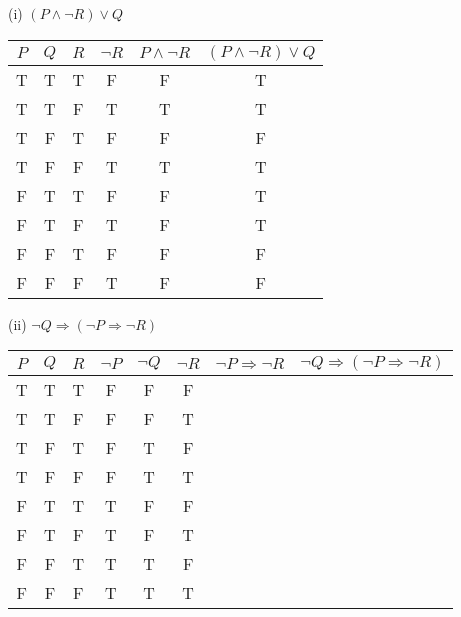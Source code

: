 \documentclass{article}
\begin{document}
(i) $(P \land \neg R) \lor Q$\\
\begin{tabular}{|c|c|c|c|c|c|}
    \hline
    $P$ & $Q$ & $R$ & $\neg R$ & $ P \land \neg R$ & $(P \land \neg R) \lor Q$ \\
    \hline
    T   & T   & T   & F        & F                 & T                         \\
    T   & T   & F   & T        & T                 & T                         \\
    T   & F   & T   & F        & F                 & F                         \\
    T   & F   & F   & T        & T                 & T                         \\
    F   & T   & T   & F        & F                 & T                         \\
    F   & T   & F   & T        & F                 & T                         \\
    F   & F   & T   & F        & F                 & F                         \\
    F   & F   & F   & T        & F                 & F                         \\
    \hline
\end{tabular}

(ii) $\neg Q \Rightarrow (\neg P \Rightarrow \neg R)$\\
\begin{tabular}{|c|c|c|c|c|c|c|c|}
    \hline
    $P$ & $Q$ & $R$ & $\neg P $ & $\neg Q$ & $\neg R$ & $\neg P \Rightarrow \neg R $ & $\neg Q \Rightarrow (\neg P \Rightarrow \neg R)$ \\
    \hline
    T   & T   & T   & F         & F        & F        &                                                                                 \\
    T   & T   & F   & F         & F        & T        &                                                                                 \\
    T   & F   & T   & F         & T        & F        &                                                                                 \\
    T   & F   & F   & F         & T        & T        &                                                                                 \\
    F   & T   & T   & T         & F        & F        &                                                                                 \\
    F   & T   & F   & T         & F        & T        &                                                                                 \\
    F   & F   & T   & T         & T        & F        &                                                                                 \\
    F   & F   & F   & T         & T        & T        &                                                                                 \\
    \hline
\end{tabular}
\end{document}

